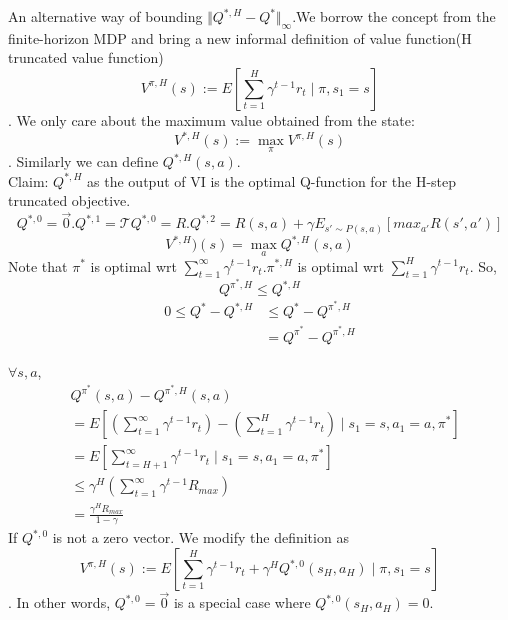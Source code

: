 \documentclass{report}
\begin{document}
An alternative way of bounding $\Vert Q^{*, H}-Q^{*}\Vert_{\infty}$.We borrow the concept from the finite-horizon MDP and bring a new informal definition of value function(H truncated value function)\[ V^{\pi, H}(s) := E[\sum_{t=1}^{H}\gamma^{t-1}r_t \mid \pi, s_1=s]\]. We only care about the maximum value obtained from the state: \[ V^{*, H}(s) := \max_{\pi}V^{\pi, H}(s)\]. Similarly we can define $Q^{*,H}(s,a)$.\\ 
Claim: $Q^{*,H}$ as the output of VI is the optimal Q-function for the H-step truncated objective.\[Q^{*,0}=\Vec{0}. Q^{*,1}=\mathcal{T}Q^{*,0}=R. Q^{*,2}=R(s,a)+\gamma E_{s'\sim P(s,a)}[max_{a'}R(s',a')]\]
\[V^{*,H})(s)=\max_{a}Q^{*,H}(s,a)\]
Note that $\pi^*$ is optimal wrt $\sum_{t=1}^{\infty}\gamma^{t-1}r_t$.$\pi^{*,H}$ is optimal wrt $\sum_{t=1}^{H}\gamma^{t-1}r_t$. So, 
\[
Q^{\pi^*,H} \leq Q^{*,H}
\]
\begin{equation*}
\begin{split}
      0 \leq Q^*-Q^{*,H} &\leq Q^*-Q^{\pi^*,H} \\
    &= Q^{\pi^*}-Q^{\pi^*,H}   
\end{split}
\end{equation*}

$\forall s,a$, \begin{equation*}
    \begin{split}
        &Q^{\pi^*}(s,a)-Q^{\pi^*,H}(s,a) \\
        &= E[(\sum_{t=1}^{\infty}\gamma^{t-1}r_t)-(\sum_{t=1}^{H}\gamma^{t-1}r_t)\mid s_1=s,a_1=a,\pi^*] \\
        &=E[\sum_{t=H+1}^{\infty}\gamma^{t-1}r_t \mid s_1=s,a_1=a,\pi^*]\\
        &\leq \gamma^H(\sum_{t=1}^{\infty} \gamma^{t-1}R_{max}) \\
        &=\frac{\gamma^H R_{max}}{1-\gamma}
    \end{split}
\end{equation*}
If $Q^{*,0}$ is not a zero vector. We modify the definition as \[ V^{\pi, H}(s) := E[\sum_{t=1}^{H}\gamma^{t-1}r_t+\gamma^{H}Q^{*,0}(s_H,a_H) \mid \pi, s_1=s]\]. In other words, $Q^{*,0}=\Vec{0}$ is a special case where $Q^{*,0}(s_H,a_H)=0$.
\end{document}
